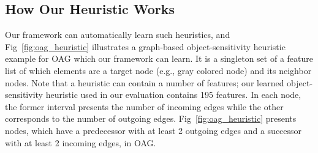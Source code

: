 \subsection{How Our Heuristic Works}
\begin{comment}
Fig~\ref{fig:oag_heuristic} is an example of graph-based 
object-sensitivity heuristic for OAG which
can be learned from our framework.
The heuristic is a singleton set of a feature which is a list that has a center
node (e.g., gray colored node) and each node contains a
pair of intervals.
Note that a heuristic can contain lots of features; our actual learned object-sensitivity heuristic contains 195 features.
In each node, the former interval present the
number of incoming edges while the other one corresponds to the number
of outgoing edges.
The feature presents a property of nodes in OAG that
have a predecessor having at least 2 outgoing edges and a successor
with at least 2 incoming edges.
\end{comment}
Our framework can automatically learn such heuristics, and
Fig~\ref{fig:oag_heuristic} illustrates a graph-based object-sensitivity heuristic example for OAG which our framework can learn.
It is a singleton set of a feature list of which elements are a target node (e.g., gray colored node) and its neighbor nodes. 
Note that a heuristic can contain a number of features; our learned object-sensitivity heuristic used in our evaluation contains 195 features.
In each node, the former interval presents the number of incoming edges while the other corresponds to the number of outgoing edges.
Fig~\ref{fig:oag_heuristic} presents nodes, which have a predecessor with at least 2 outgoing edges and a successor
with at least 2 incoming edges, in OAG.

